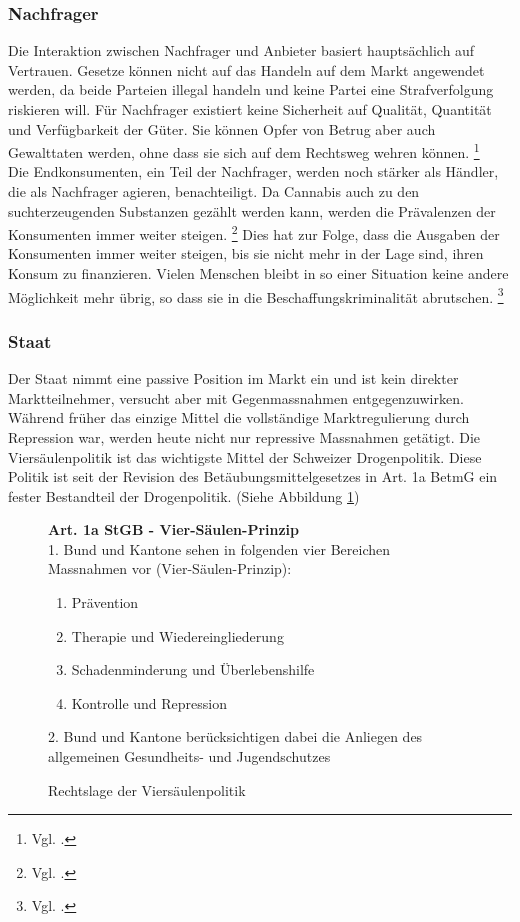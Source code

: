 \documentclass[../main.tex]{subfiles}
\begin{document}
	
	\subsubsection{Nachfrager}
	Die Interaktion zwischen Nachfrager und Anbieter basiert hauptsächlich auf Vertrauen.
	Gesetze können nicht auf das Handeln auf dem Markt angewendet werden, da beide Parteien illegal handeln und keine Partei eine Strafverfolgung riskieren will.
	Für Nachfrager existiert keine Sicherheit auf Qualität, Quantität und Verfügbarkeit der Güter.
	Sie können Opfer von Betrug aber auch Gewalttaten werden, ohne dass sie sich auf dem Rechtsweg wehren können.%
	\footnote{Vgl. \cite{departmentofjustice-1994}.}\\
	
	\noindent	
	Die Endkonsumenten, ein Teil der Nachfrager, werden noch stärker als Händler, die als Nachfrager agieren, benachteiligt.
	Da Cannabis auch zu den suchterzeugenden Substanzen gezählt werden kann, werden die Prävalenzen der Konsumenten immer weiter steigen.%
	\footnote{Vgl. \cite{becker}.}
	Dies hat zur Folge, dass die Ausgaben der Konsumenten immer weiter steigen, bis sie nicht mehr in der Lage sind, ihren Konsum zu finanzieren.
	Vielen Menschen bleibt in so einer Situation keine andere Möglichkeit mehr übrig, so dass sie in die Beschaffungskriminalität abrutschen.%
	\footnote{Vgl. \cite{departmentofjustice-1994}.}
	
	
	\subsubsection{Staat}
	Der Staat nimmt eine passive Position im Markt ein und ist kein direkter Marktteilnehmer, versucht aber mit Gegenmassnahmen entgegenzuwirken.
	Während früher das einzige Mittel die vollständige Marktregulierung durch Repression war, werden heute nicht nur repressive Massnahmen getätigt.
	Die Viersäulenpolitik ist das wichtigste Mittel der Schweizer Drogenpolitik.
	Diese Politik ist seit der Revision des Betäubungsmittelgesetzes in Art. 1a BetmG ein fester Bestandteil der Drogenpolitik.
	(Siehe Abbildung \ref{fig:stgb-art-1a})
	
	\begin{figure}[H]
	\begin{tcolorbox}
		\small
	 	\textbf{Art. 1a StGB - Vier-Säulen-Prinzip}\\[7pt]
	 	1. \quad Bund und Kantone sehen in folgenden vier Bereichen Massnahmen vor (Vier-Säulen-Prinzip):
		\begin{enumerate}[label=\alph*.]
			\item Prävention
			\item Therapie und Wiedereingliederung
			\item Schadenminderung und Überlebenshilfe
			\item Kontrolle und Repression
		\end{enumerate}
		2. \quad Bund und Kantone berücksichtigen dabei die Anliegen des allgemeinen Gesundheits- und Jugendschutzes
	\end{tcolorbox}	
	\captionsetup{font=small, skip=0pt}
	\caption{Rechtslage der Viersäulenpolitik}
	\label{fig:stgb-art-1a}
	\end{figure}
	 
\end{document}
